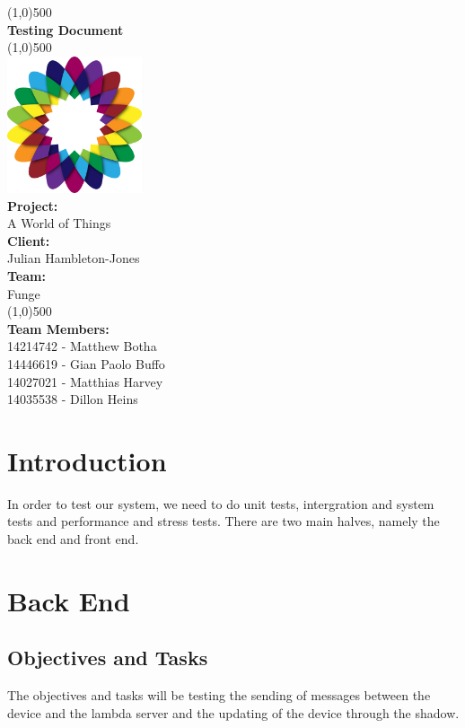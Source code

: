 \documentclass{article}
\begin{document}
\begin{titlepage}
	\begin{center}
		\line(1,0){500}\\
		[6mm]
		\huge{\bfseries Testing Document}\\
		\line(1,0){500}\\
		[5mm]
		\includegraphics[width=150px]{../images/AWorldOfPlants.png}
		\\
		[5mm]
		\large\textbf{Project:}\\A World of Things\\
		[3mm]
		\large\textbf{Client:}\\Julian Hambleton-Jones\\
		[3mm]
		\large \textbf{Team:}\\Funge\\
		\line(1,0){500}\\
		[5mm]
		\large \textbf{Team Members:}\\
		[3mm]
		\large 14214742 - Matthew Botha\\
		\large 14446619 - Gian Paolo Buffo\\
		\large 14027021 - Matthias Harvey\\
        \large 14035538 - Dillon Heins\\[3mm]
	\end{center}
\end{titlepage}

\cleardoublepage
\thispagestyle{empty}
\tableofcontents
\cleardoublepage
\setcounter{page}{1}

\section{Introduction}
	In order to test our system, we need to do unit tests, intergration and system tests and performance and stress tests. There are two main halves, namely the back end and front end.

\section{Back End}
	\subsection{Objectives and Tasks}
		The objectives and tasks will be testing the sending of messages between the device and the lambda server and the updating of the device through the shadow.
	
\end{document}
